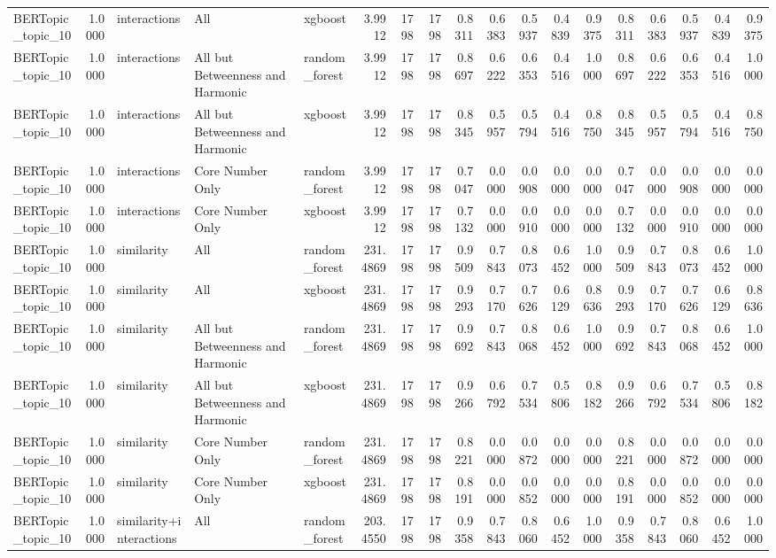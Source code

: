 \begin{tabular}{lrlllrrrrrrrrrrrrr}
BERTopic_topic_10 & 1.0000 & interactions & All & xgboost & 3.9912 & 1798 & 1798 & 0.8311 & 0.6383 & 0.5937 & 0.4839 & 0.9375 & 0.8311 & 0.6383 & 0.5937 & 0.4839 & 0.9375 \\
BERTopic_topic_10 & 1.0000 & interactions & All but Betweenness and Harmonic & random_forest & 3.9912 & 1798 & 1798 & 0.8697 & 0.6222 & 0.6353 & 0.4516 & 1.0000 & 0.8697 & 0.6222 & 0.6353 & 0.4516 & 1.0000 \\
BERTopic_topic_10 & 1.0000 & interactions & All but Betweenness and Harmonic & xgboost & 3.9912 & 1798 & 1798 & 0.8345 & 0.5957 & 0.5794 & 0.4516 & 0.8750 & 0.8345 & 0.5957 & 0.5794 & 0.4516 & 0.8750 \\
BERTopic_topic_10 & 1.0000 & interactions & Core Number Only & random_forest & 3.9912 & 1798 & 1798 & 0.7047 & 0.0000 & 0.0908 & 0.0000 & 0.0000 & 0.7047 & 0.0000 & 0.0908 & 0.0000 & 0.0000 \\
BERTopic_topic_10 & 1.0000 & interactions & Core Number Only & xgboost & 3.9912 & 1798 & 1798 & 0.7132 & 0.0000 & 0.0910 & 0.0000 & 0.0000 & 0.7132 & 0.0000 & 0.0910 & 0.0000 & 0.0000 \\
BERTopic_topic_10 & 1.0000 & similarity & All & random_forest & 231.4869 & 1798 & 1798 & 0.9509 & 0.7843 & 0.8073 & 0.6452 & 1.0000 & 0.9509 & 0.7843 & 0.8073 & 0.6452 & 1.0000 \\
BERTopic_topic_10 & 1.0000 & similarity & All & xgboost & 231.4869 & 1798 & 1798 & 0.9293 & 0.7170 & 0.7626 & 0.6129 & 0.8636 & 0.9293 & 0.7170 & 0.7626 & 0.6129 & 0.8636 \\
BERTopic_topic_10 & 1.0000 & similarity & All but Betweenness and Harmonic & random_forest & 231.4869 & 1798 & 1798 & 0.9692 & 0.7843 & 0.8068 & 0.6452 & 1.0000 & 0.9692 & 0.7843 & 0.8068 & 0.6452 & 1.0000 \\
BERTopic_topic_10 & 1.0000 & similarity & All but Betweenness and Harmonic & xgboost & 231.4869 & 1798 & 1798 & 0.9266 & 0.6792 & 0.7534 & 0.5806 & 0.8182 & 0.9266 & 0.6792 & 0.7534 & 0.5806 & 0.8182 \\
BERTopic_topic_10 & 1.0000 & similarity & Core Number Only & random_forest & 231.4869 & 1798 & 1798 & 0.8221 & 0.0000 & 0.0872 & 0.0000 & 0.0000 & 0.8221 & 0.0000 & 0.0872 & 0.0000 & 0.0000 \\
BERTopic_topic_10 & 1.0000 & similarity & Core Number Only & xgboost & 231.4869 & 1798 & 1798 & 0.8191 & 0.0000 & 0.0852 & 0.0000 & 0.0000 & 0.8191 & 0.0000 & 0.0852 & 0.0000 & 0.0000 \\
BERTopic_topic_10 & 1.0000 & similarity+interactions & All & random_forest & 203.4550 & 1798 & 1798 & 0.9358 & 0.7843 & 0.8060 & 0.6452 & 1.0000 & 0.9358 & 0.7843 & 0.8060 & 0.6452 & 1.0000 \\

\end{tabular}
